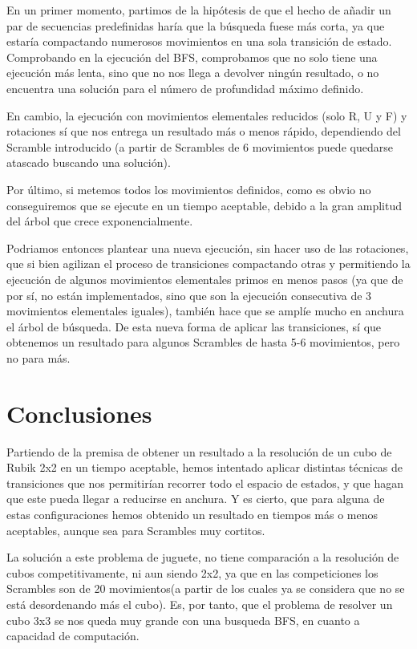 \documentclass[11pt]{article}
\begin{document}
En un primer momento, partimos de la hipótesis de que el hecho de añadir un par de secuencias predefinidas haría que la búsqueda fuese más corta, ya que estaría compactando numerosos movimientos en una sola transición de estado. Comprobando en la ejecución del BFS, comprobamos que no solo tiene una ejecución más lenta, sino que no nos llega a devolver ningún resultado, o no encuentra una solución para el número de profundidad máximo definido.
\newline

En cambio, la ejecución con movimientos elementales reducidos (solo R, U y F) y rotaciones sí que nos entrega un resultado más o menos rápido, dependiendo del Scramble introducido (a partir de Scrambles de 6 movimientos puede quedarse atascado buscando una solución).
\newline

Por último, si metemos todos los movimientos definidos, como es obvio no conseguiremos que se ejecute en un tiempo aceptable, debido a la gran amplitud del árbol que crece exponencialmente.
\newline

Podriamos entonces plantear una nueva ejecución, sin hacer uso de las rotaciones, que si bien agilizan el proceso de transiciones compactando otras y permitiendo la ejecución de algunos movimientos elementales primos en menos pasos (ya que de por sí, no están implementados, sino que son la ejecución consecutiva de 3 movimientos elementales iguales), también hace que se amplíe mucho en anchura el árbol de búsqueda. De esta nueva forma de aplicar las transiciones, sí que obtenemos un resultado para algunos Scrambles de hasta 5-6 movimientos, pero no para más.

\section{Conclusiones}
Partiendo de la premisa de obtener un resultado a la resolución de un cubo de Rubik 2x2 en un tiempo aceptable, hemos intentado aplicar distintas técnicas de transiciones que nos permitirían recorrer todo el espacio de estados, y que hagan que este pueda llegar a reducirse en anchura. Y es cierto, que para alguna de estas configuraciones hemos obtenido un resultado en tiempos más o menos aceptables, aunque sea para Scrambles muy cortitos. 
\newline

La solución a este problema de juguete, no tiene comparación a la resolución de cubos competitivamente, ni aun siendo 2x2, ya que en las competiciones los Scrambles son de 20 movimientos(a partir de los cuales ya se considera que no se está desordenando más el cubo). Es, por tanto, que el problema de resolver un cubo 3x3 se nos queda muy grande con una busqueda BFS, en cuanto a capacidad de computación.
\newline
\end{document}
